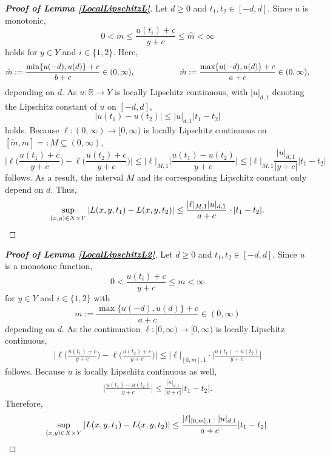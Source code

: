 \documentclass[10pt]{article}
\newcommand{\R}{\mathbb{R}}
\newcommand{\XY}{X \times Y}
\begin{document}
\begin{proof}[\upshape\bfseries Proof of Lemma \ref{LocalLipschitzL}]
	Let $d \geq 0$ and $t_1, t_2 \in [-d, d]$.
	Since $u$ is monotonic, 
	\begin{equation*}
		0 < \check{m} \leq \frac{u(t_i)+c}{y+c} \leq \hat{m} < \infty
	\end{equation*}
	holds for $y \in Y$ and $i \in \{1,2\}$.
	Here, 
	\begin{equation*}
		\check{m} := \frac{\min\{u(-d), u(d)\}+c}{b + c} \in (0, \infty), \hspace*{2cm} \hat{m} := \frac{\max\{u(-d), u(d)\}+c}{a + c} \in (0, \infty),  
	\end{equation*}
	depending on $d$.
	As $u: \R \to Y$ is locally Lipschitz continuous, with $|u|_{d, 1}$ denoting the Lipschitz constant of $u$ on $[-d,d]$,
	\begin{equation*}
		|u(t_1) - u(t_2)| \leq |u|_{d,1} |t_1 - t_2|
	\end{equation*}
	holds. 
	Because $\ell: (0, \infty) \to [0, \infty)$ is locally Lipschitz continuous on $[\check{m}, \hat{m}] =: M \subseteq (0, \infty)$,
	\begin{equation*}
		\biggl|\ell\biggl(\frac{u(t_1)+c}{y+c}\biggr)-\ell\biggl(\frac{u(t_2)+c}{y+c}\biggr)\biggr| \leq |\ell|_{M,1} \biggl|\frac{u(t_1)-u(t_2)}{y+c}\biggr| \leq |\ell|_{M,1} \frac{|u|_{d,1}}{|y+c|} |t_1 - t_2| 
	\end{equation*}
	follows.
	As a result, the interval $M$ and its corresponding Lipschitz constant only depend on $d$.
	Thus,
	\begin{equation*}
		\sup_{(x,y) \in \XY} |L(x,y,t_1)-L(x,y,t_2)| \leq \frac{|\ell|_{M,1}|u|_{d,1}}{a+c} \cdot |t_1-t_2|. \qedhere
	\end{equation*}
\end{proof}
\begin{proof}[\upshape\bfseries Proof of Lemma \ref{LocalLipschitzL2}]
	Let $d \geq 0$ and $t_1, t_2 \in [-d,d]$. 
	Since $u$ is a monotone function,  
	\begin{equation*}
		0 < \frac{u(t_i)+c}{y+c} \leq m < \infty
	\end{equation*} 
	for $y \in Y$ and $i \in \{1,2\}$ with
	\begin{equation*}
		m :=  \frac{\max\{u(-d), u(d)\}+c}{a + c} \in (0, \infty)
	\end{equation*}
	depending on $d$.	
	As the continuation $\ell: [0, \infty) \to [0, \infty)$ is locally Lipschitz continuous, 
	\begin{align*}
		\biggl|\ell\biggl(\frac{u(t_1)+c}{y+c}\biggr)-\ell\biggl(\frac{u(t_2)+c}{y+c}\biggr)\biggr| \leq |\ell|_{[0,m],1} \cdot \biggl|\frac{u(t_1)-u(t_2)}{y+c}\biggr| 
	\end{align*}
	follows. 
	Because $u$ is locally Lipschitz continuous as well,
	\begin{align*}
		\biggl|\frac{u(t_1)-u(t_2)}{y+c}\biggr| \leq \frac{|u|_{d,1}}{|y+c|} |t_1 - t_2|.
	\end{align*}
	Therefore, 
	\begin{equation*}
		\sup_{(x,y) \in \XY} |L(x,y,t_1) - L(x,y,t_2)| \leq \frac{|\ell|_{[0,m],1} \cdot |u|_{d,1}}{a+c} |t_1-t_2|. \qedhere
	\end{equation*}
\end{proof}
\end{document}
